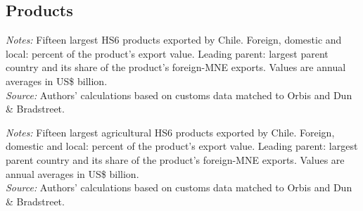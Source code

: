 \documentclass[11pt,a4paper]{article}
\begin{document}
\subsection{Products}
\begin{table}[H]\centering\footnotesize%
  \caption{Chile: Fifteen Largest Export Products}%
  \label{tab:c_hs6_CHL}%
  \par\vspace{3pt}%
  \begin{minipage}{0.95\textwidth}\footnotesize %
  \textit{Notes:} Fifteen largest HS6 products exported by Chile. Foreign, domestic and local: percent of the product's export value. Leading parent: largest parent country and its share of the product's foreign-MNE exports. Values are annual averages in US\$ billion.\\[3pt]%
  \textit{Source:} Authors' calculations based on customs data matched to Orbis and Dun \& Bradstreet.%
  \end{minipage}%
  \end{table}
\begin{table}[H]\centering\footnotesize%
  \caption{Chile, Agriculture: Fifteen Largest Export Products}%
  \label{tab:c_hs6_CHL_agro}%
  \par\vspace{3pt}%
  \begin{minipage}{0.95\textwidth}\footnotesize %
  \textit{Notes:} Fifteen largest agricultural HS6 products exported by Chile. Foreign, domestic and local: percent of the product's export value. Leading parent: largest parent country and its share of the product's foreign-MNE exports. Values are annual averages in US\$ billion.\\[3pt]%
  \textit{Source:} Authors' calculations based on customs data matched to Orbis and Dun \& Bradstreet.%
  \end{minipage}%
  \end{table}
\end{document}
